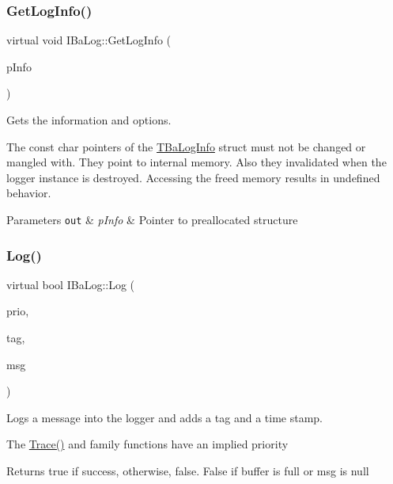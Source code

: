 \subsubsection{\texorpdfstring{Get\+Log\+Info()}{GetLogInfo()}}
{\footnotesize\ttfamily virtual void I\+Ba\+Log\+::\+Get\+Log\+Info (\begin{DoxyParamCaption}\item[{\hyperlink{structTBaLogInfo}{T\+Ba\+Log\+Info} $\ast$}]{p\+Info }\end{DoxyParamCaption})\hspace{0.3cm}{\ttfamily [pure virtual]}}



Gets the information and options. 

The const char pointers of the \hyperlink{structTBaLogInfo}{T\+Ba\+Log\+Info} struct must not be changed or mangled with. They point to internal memory. Also they invalidated when the logger instance is destroyed. Accessing the freed memory results in undefined behavior. 
\begin{DoxyParams}[1]{Parameters}
\mbox{\tt out}  & {\em p\+Info} & Pointer to preallocated structure \\
\hline
\end{DoxyParams}
\mbox{\label{classIBaLog_aa5af90c31d02caaf2ce598eb71f774ad}} 
\subsubsection{\texorpdfstring{Log()}{Log()}}
{\footnotesize\ttfamily virtual bool I\+Ba\+Log\+::\+Log (\begin{DoxyParamCaption}\item[{\hyperlink{BaLog_8h_ab14f00a81932b8b62d2e8c4a2d7e3916}{E\+Ba\+Log\+Prio}}]{prio,  }\item[{const char $\ast$}]{tag,  }\item[{const char $\ast$}]{msg }\end{DoxyParamCaption})\hspace{0.3cm}{\ttfamily [pure virtual]}}



Logs a message into the logger and adds a {\ttfamily tag} and a time stamp. 

The {\ttfamily \hyperlink{classIBaLog_a3daf158cda6813367b7324ef5171291b}{Trace()}} and family functions have an implied priority \begin{DoxyReturn}{Returns}
true if success, otherwise, false. False if buffer is full or {\ttfamily msg} is null 
\end{DoxyReturn}

